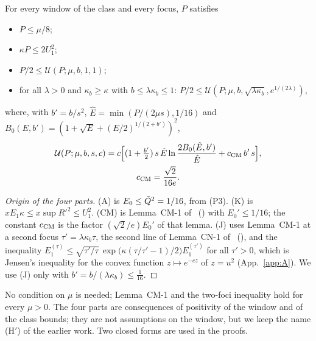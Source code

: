 \begin{lemma} \proofst
\label{lem:Hprime}
For every window of the class and every focus, $P$ satisfies
\begin{itemize}
\item[(A)] $P\le\mu/8$;
\item[(K)] $\kappa P\le2U_1^2$;
\item[(CM)] $P/2\le\mathcal U(P;\mu,b,1,1)$;
\item[(J)] for all $\lambda>0$ and $\kappa_b\ge\kappa$ with $b\le\lambda\kappa_b\le1$: $P/2\le\mathcal U(P;\mu,b,\sqrt{\lambda\kappa_b},e^{1/(2\lambda)})$,
\end{itemize}
where, with $b'=b/s^2$, $\hat E=\min(P/(2\mu s),1/16)$ and $B_0(E,b')=(1+\sqrt E+(E/2)^{1/(2+b')})^2$,
\begin{gather}
\mathcal U(P;\mu,b,s,c)=c\Bigl[(1+\tfrac{b'}2)\,s\,\hat E\ln\frac{2B_0(\hat E,b')}{\hat E}+c_{\rm CM}\,b'\,s\Bigr],\nonumber\\ c_{\rm CM}=\frac{\sqrt2}{16e}.
\end{gather}
\end{lemma}

\begin{proof}[Origin of the four parts]
(A) is $E_0\le\bar Q^2=1/16$, from (P3).
(K) is $x E_1\kappa\le x\sup R'^2\le U_1^2$.
(CM) is Lemma~CM-1 of~\cite{H} () with $E_0'\le1/16$; the constant $c_{\rm CM}$ is the factor $(\sqrt2/e)E_0'$ of that lemma.
(J) uses Lemma~CM-1 at a second focus $\tau'=\lambda\kappa_b\tau$, the second line of Lemma~CN-1 of~\cite{H} (), and the inequality
$E_1^{(\tau)}\le\sqrt{\tau'/\tau}\,\exp\bigl(\kappa(\tau/\tau'-1)/2\bigr)E_1^{(\tau')}$ for all $\tau'>0$, which is Jensen's inequality for the convex function $z\mapsto e^{-cz}$ of $z=u^2$ (App.~\ref{app:A}).
We use (J) only with $b'=b/(\lambda\kappa_b)\le\tfrac1{16}$.
\end{proof}

No condition on $\mu$ is needed; Lemma~CM-1 and the two-foci inequality hold for every $\mu>0$.
The four parts are consequences of positivity of the window and of the class bounds; they are not assumptions on the window, but we keep the name (H$'$) of the earlier work.
Two closed forms are used in the proofs.

